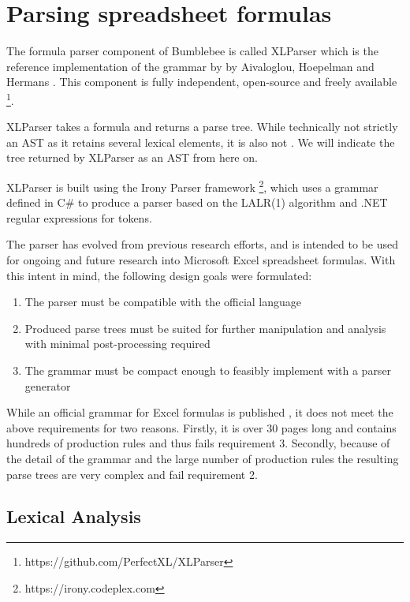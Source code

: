 \chapter{Parsing spreadsheet formulas}


The formula parser component of Bumblebee is called XLParser which is the reference implementation of the grammar by by Aivaloglou, Hoepelman and Hermans \cite{xlparser}.
This component is fully independent, open-source and freely available \footnote{https://github.com/PerfectXL/XLParser}.

XLParser takes a formula and returns a parse tree.
While technically not strictly an AST as it retains several lexical elements, it is also not .
We will indicate the tree returned by XLParser as an AST from here on.

XLParser is built using the Irony Parser framework \footnote{https://irony.codeplex.com}, which uses a grammar defined in C\# to produce a parser based on the LALR(1) algorithm and .NET regular expressions for tokens.

The parser has evolved from previous research efforts, and is intended to be used for ongoing and future research into Microsoft Excel spreadsheet formulas.
With this intent in mind, the following design goals were formulated:

\begin{enumerate}
\label{sec:designgoals}
\item The parser must be compatible with the official language
\item Produced parse trees must be suited for further manipulation and analysis with minimal post-processing required
\item The grammar must be compact enough to feasibly implement with a parser generator
\end{enumerate}

While an official grammar for Excel formulas is published \cite{ExcelOfficialGrammar}, it does not meet the above requirements for two reasons.
Firstly, it is over 30 pages long and contains hundreds of production rules and thus fails requirement 3.
Secondly, because of the detail of the grammar and the large number of production rules the resulting parse trees are very complex and fail requirement 2.

\section{Lexical Analysis}
\label{sec:lexanalysis}

